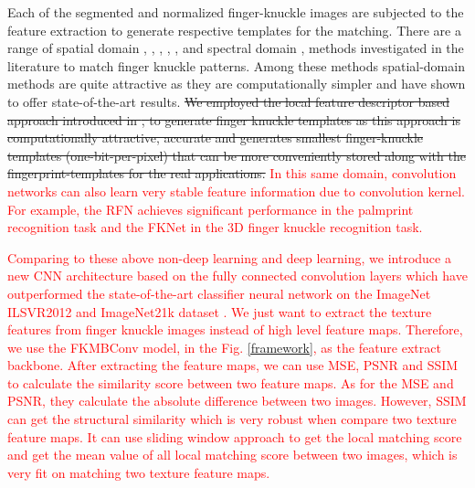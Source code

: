 Each of the segmented and normalized finger-knuckle images are subjected to the feature extraction to generate respective templates for the matching. There are a range of spatial domain \cite{sricharan2006knuckle}, \cite{kumar2009personal}, \cite{zhang2010online}, \cite{zhu2010multimodal}, \cite{zheng20163d}, \cite{kumar2016personal} and spectral domain \cite{aoyama2011finger}, \cite{kumar2015recovering} methods investigated in the literature to match finger knuckle patterns. Among these methods spatial-domain methods are quite attractive as they are computationally simpler and have shown to offer state-of-the-art results. \sout{We employed the local feature descriptor based approach introduced in \cite{zheng20163d}, \cite{kumar2016personal} to generate finger knuckle templates as this approach is computationally attractive, accurate and generates smallest finger-knuckle templates (one-bit-per-pixel) that can be more conveniently stored along with the fingerprint-templates for the real applications.} \textcolor{red}{In this same domain, convolution networks can also learn very stable feature information due to convolution kernel. For example, the RFN \cite{liu2020contactless} achieves significant performance in the palmprint recognition task and the FKNet \cite{cheng2020deep} in the 3D finger knuckle recognition task.}

\textcolor{red}{Comparing to these above non-deep learning and deep learning, we introduce a new CNN architecture based on the fully connected convolution layers \cite{tan2021efficientnetv2} which have outperformed the state-of-the-art classifier neural network on the ImageNet ILSVR2012 and ImageNet21k dataset \cite{russakovsky2015imagenet}. We just want to extract the texture features from finger knuckle images instead of high level feature maps. Therefore, we use the FKMBConv model, in the Fig. \ref{framework}, as the feature extract backbone. After extracting the feature maps, we can use MSE, PSNR and SSIM \cite{wang2004image} to calculate the similarity score between two feature maps. As for the MSE and PSNR, they calculate the absolute difference between two images. However, SSIM \cite{wang2004image} can get the structural similarity which is very robust when compare two texture feature maps. It can use sliding window approach to get the local matching score and get the mean value of all local matching score between two images, which is very fit on matching two texture feature maps.} 

